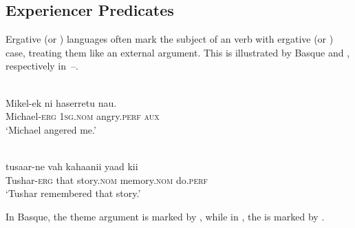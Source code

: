\documentclass[output=paper]{LSP/langsci}
\begin{document}
\subsection{Experiencer Predicates}\label{14-sec:3.2}

Ergative (or ) languages often mark the subject of an  verb with ergative (or ) case, treating them like an external argument. This is illustrated by Basque and , respectively in~--.

\begin{exe}
\ex%
\label{14-ya-ex:14}
\\
\gll Mikel-ek ni haserretu nau.\\
Michael-\textsc{erg} 1\textsc{sg}.\textsc{nom} angry.\textsc{perf} \textsc{aux}\\
\glt ‘Michael angered me.’
\end{exe}

\begin{exe}
\ex%
\label{14-ya-ex:15}
\\
\gll tusaar-ne vah kahaanii yaad kii\\
Tushar-\textsc{erg} that story.\textsc{nom} memory.\textsc{nom} do.\textsc{perf}\\
\glt ‘Tushar remembered that story.’
\end{exe}

In Basque, the theme argument is marked by  , while in , the  is marked by  .
\end{document}
